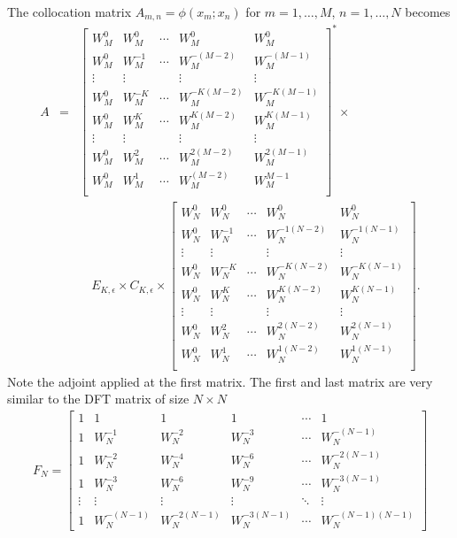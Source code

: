 \documentclass[a4paper,10pt]{article}
\begin{document}
The collocation matrix $A_{m,n}=\phi(x_m;x_n)$ for $m=1,\dots,M$, $n=1,\dots,N$ becomes
\begin{eqnarray}
A
&=& 
\begin{bmatrix}
W_M^0&W_M^0&\cdots&W_M^0&W_M^0\\
W_M^0&W_M^{-1}&\cdots&W_M^{-(M-2)}&W_M^{-(M-1)}\\
\vdots&\vdots&&\vdots&\vdots\\
W_M^0&W_M^{-K}&\cdots&W_M^{-K(M-2)}&W_M^{-K(M-1)}\\
W_M^0&W_M^{K}&\cdots&W_M^{K(M-2)}&W_M^{K(M-1)}\\
\vdots&\vdots&&\vdots&\vdots\\
W_M^0&W_M^{2}&\cdots&W_M^{2(M-2)}&W_M^{2(M-1)}\\
W_M^0&W_M^{1}&\cdots&W_M^{(M-2)}&W_M^{M-1}\\
\end{bmatrix}^*\times\\
&&\quad
 E_{K,\epsilon}\times C_{K,\epsilon}\times \begin{bmatrix}
W_N^{0}&W_N^{0}&\cdots&W_N^{0}&W_N^{0}\\
W_N^{0}&W_N^{-1}&\cdots&W_N^{-1(N-2)}&W_N^{-1(N-1)}\\
\vdots&\vdots&&\vdots&\vdots\\
W_N^{0}&W_N^{-K}&\cdots&W_N^{-K(N-2)}&W_N^{-K(N-1)}\\
W_N^{0}&W_N^{K}&\cdots&W_N^{K(N-2)}&W_N^{K(N-1)}\\
\vdots&\vdots&&\vdots&\vdots\\
W_N^{0}&W_N^{2}&\cdots&W_N^{2(N-2)}&W_N^{2(N-1)}\\
W_N^{0}&W_N^{1}&\cdots&W_N^{1(N-2)}&W_N^{1(N-1)}\\
\end{bmatrix}.
\end{eqnarray}
Note the adjoint applied at the first matrix. The first and last matrix are very similar to the DFT matrix of size $N\times N$
\begin{equation}
\begin{matrix}
F_N = \begin{bmatrix}
1&1&1&1&\cdots&1\\
1&W_N^{-1}&W_N^{-2}&W_N^{-3}&\cdots&W_N^{-(N-1)}\\
1&W_N^{-2}&W_N^{-4}&W_N^{-6}&\cdots&W_N^{-2(N-1)}\\
1&W_N^{-3}&W_N^{-6}&W_N^{-9}&\cdots&W_N^{-3(N-1)}\\
\vdots&\vdots&\vdots&\vdots&\ddots&\vdots\\
1&W_N^{-(N-1)}&W_N^{-2(N-1)}&W_N^{-3(N-1)}&\cdots&W_N^{-(N-1)(N-1)}
\end{bmatrix}
\end{matrix}	
\end{equation}







\end{document}
